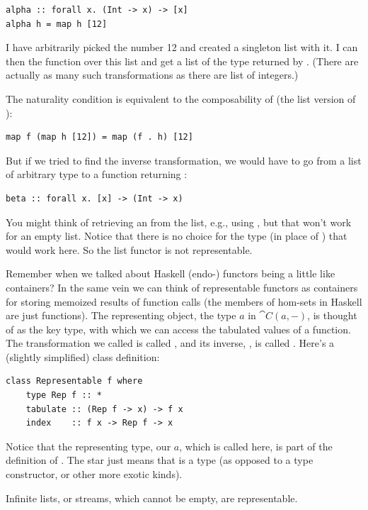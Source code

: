 \begin{Verbatim}
alpha :: forall x. (Int -> x) -> [x]
alpha h = map h [12]
\end{Verbatim}
I have arbitrarily picked the number 12 and created a singleton list
with it. I can then  the function  over this list
and get a list of the type returned by . (There are actually
as many such transformations as there are list of integers.)

The naturality condition is equivalent to the composability of
 (the list version of ):

\begin{Verbatim}
map f (map h [12]) = map (f . h) [12]
\end{Verbatim}
But if we tried to find the inverse transformation, we would have to go
from a list of arbitrary type  to a function returning
:

\begin{Verbatim}
beta :: forall x. [x] -> (Int -> x)
\end{Verbatim}
You might think of retrieving an  from the list, e.g., using
, but that won't work for an empty list. Notice that there
is no choice for the type  (in place of ) that
would work here. So the list functor is not representable.

Remember when we talked about Haskell (endo-) functors being a little
like containers? In the same vein we can think of representable functors
as containers for storing memoized results of function calls (the
members of hom-sets in Haskell are just functions). The representing
object, the type $a$ in $\cat{C}(a, -)$, is thought of as the
key type, with which we can access the tabulated values of a function.
The transformation we called  is called , and its
inverse, , is called . Here's a (slightly simplified)
 class definition:

\begin{Verbatim}
class Representable f where
    type Rep f :: *
    tabulate :: (Rep f -> x) -> f x
    index    :: f x -> Rep f -> x
\end{Verbatim}
Notice that the representing type, our $a$, which is called
 here, is part of the definition of
. The star just means that  is a
type (as opposed to a type constructor, or other more exotic kinds).

Infinite lists, or streams, which cannot be empty, are representable.

